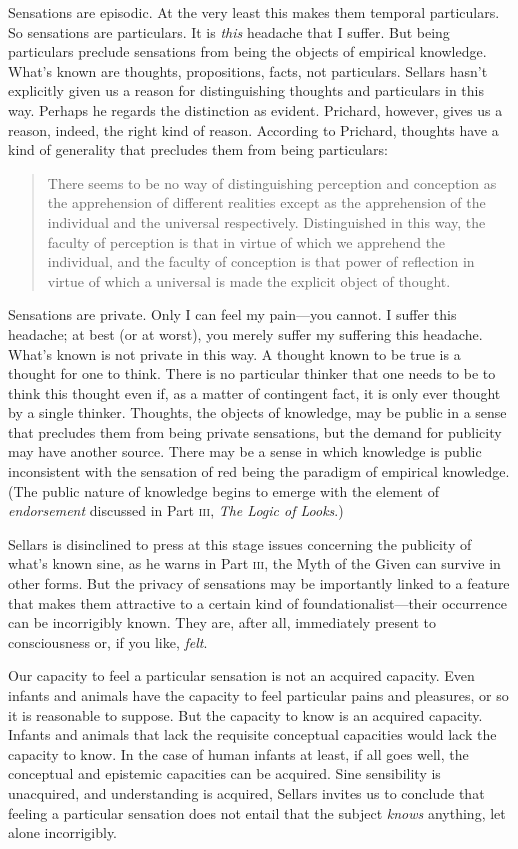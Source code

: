 \documentclass[11pt]{article}
\begin{document}
Sensations are episodic. At the very least this makes them temporal particulars. So sensations are particulars. It is \emph{this} headache that I suffer. But being particulars preclude sensations from being the objects of empirical knowledge. What's known are thoughts, propositions, facts, not particulars. Sellars hasn't explicitly given us a reason for distinguishing thoughts and particulars in this way. Perhaps he regards the distinction as evident. Prichard, however, gives us a reason, indeed, the right kind of reason. According to Prichard, thoughts have a kind of generality that precludes them from being particulars:
\begin{quote}
	There seems to be no way of distinguishing perception and conception as the apprehension of different realities except as the apprehension of the individual and the universal respectively. Distinguished in this way, the faculty of perception is that in virtue of which we apprehend the individual, and the faculty of conception is that power of reflection in virtue of which a universal is made the explicit object of thought.
\end{quote}

Sensations are private. Only I can feel my pain---you cannot. I suffer this headache; at best (or at worst), you merely suffer my suffering this headache. What's known is not private in this way. A thought known to be true is a thought for one to think. There is no particular thinker that one needs to be to think this thought even if, as a matter of contingent fact, it is only ever thought by a single thinker. Thoughts, the objects of knowledge, may be public in a sense that precludes them from being private sensations, but the demand for publicity may have another source. There may be a sense in which knowledge is public inconsistent with the sensation of red being the paradigm of empirical knowledge. (The public nature of knowledge begins to emerge with the element of \emph{endorsement} discussed in Part \textsc{iii}, \emph{The Logic of Looks}.)

Sellars is disinclined to press at this stage issues concerning the publicity of what's known sine, as he warns in Part \textsc{iii}, the Myth of the Given can survive in other forms. But the privacy of sensations may be importantly linked to a feature that makes them attractive to a certain kind of foundationalist---their occurrence can be incorrigibly known. They are, after all, immediately present to consciousness or, if you like, \emph{felt}.

Our capacity to feel a particular sensation is not an acquired capacity. Even infants and animals have the capacity to feel particular pains and pleasures, or so it is reasonable to suppose. But the capacity to know is an acquired capacity. Infants and animals that lack the requisite conceptual capacities would lack the capacity to know. In the case of human infants at least, if all goes well, the conceptual and epistemic capacities can be acquired. Sine sensibility is unacquired, and understanding is acquired, Sellars invites us to conclude that feeling a particular sensation does not entail that the subject \emph{knows} anything, let alone incorrigibly.
\end{document}
